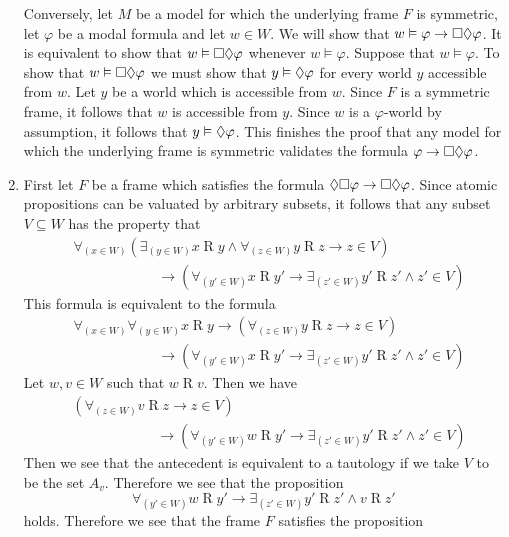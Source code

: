 \documentclass{article}
\begin{document}
\begin{ex}
\begin{enumerate}
Conversely, let $M$ be a model for which the underlying frame $F$ is symmetric,
let $\varphi$ be a modal formula and let $w\in W$. We will show that $w\vDash
\varphi\to\square\lozenge\varphi$. It is equivalent to show that $w\vDash\square\lozenge\varphi$
whenever $w\models\varphi$. Suppose that $w\models\varphi$. To show that
$w\vDash\square\lozenge\varphi$ we must show that $y\vDash\lozenge\varphi$ for every
world $y$ accessible from $w$. Let $y$ be a world which is accessible from $w$.
Since $F$ is a symmetric frame, it follows that $w$ is accessible from $y$.
Since $w$ is a $\varphi$-world by assumption, it follows that $y\vDash\lozenge\varphi$.
This finishes the proof that any model for which the underlying frame is symmetric
validates the formula $\varphi\to\square\lozenge\varphi$. 
\item First let $F$ be a frame which satisfies the formula $\lozenge\square\varphi\to\square\lozenge\varphi$.
Since atomic propositions can be valuated by arbitrary subsets, it follows that
any subset $V\subseteq W$ has the property that
\begin{align*}
& \forall_{(x\in W)} 
  (\exists_{(y\in W)} x\mathbin{R}y\land\forall_{(z\in W)}y\mathbin{R} z\to z\in V)
  \\
  & \qquad\qquad\qquad \to
  (\forall_{(y'\in W)} x\mathbin{R}y'\to\exists_{(z'\in W)}y'\mathbin{R} z'\land z'\in V)
\end{align*}
This formula is equivalent to the formula
\begin{align*}
& \forall_{(x\in W)} \forall_{(y\in W)} x\mathbin{R}y \to
  (\forall_{(z\in W)}y\mathbin{R} z\to z\in V)
  \\
  & \qquad\qquad\qquad \to
  (\forall_{(y'\in W)} x\mathbin{R}y'\to\exists_{(z'\in W)}y'\mathbin{R} z'\land z'\in V)
\end{align*}
Let $w,v\in W$ such that $w\mathbin{R}v$. Then we have
\begin{align*}
& (\forall_{(z\in W)}v\mathbin{R} z\to z\in V)
  \\
  & \qquad\qquad\qquad \to
  (\forall_{(y'\in W)} w\mathbin{R}y'\to\exists_{(z'\in W)}y'\mathbin{R} z'\land z'\in V)
\end{align*}
Then we see that the antecedent is equivalent to a tautology if we take $V$ to
be the set $A_v$. Therefore we see that the proposition
\begin{equation*}
\forall_{(y'\in W)} w\mathbin{R}y'\to\exists_{(z'\in W)}y'\mathbin{R} z'\land v\mathbin{R} z'
\end{equation*}
holds. Therefore we see that the frame $F$ satisfies the proposition

\end{enumerate}
\end{ex}
\end{document}
